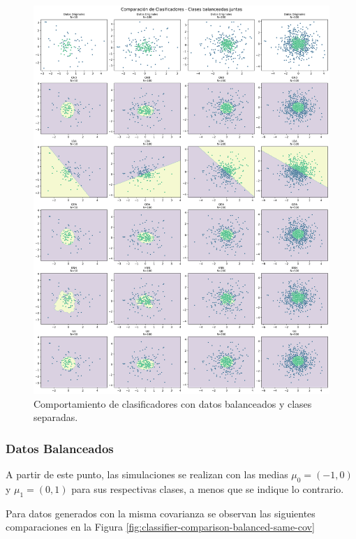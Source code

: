 \documentclass[10pt]{article}
\begin{document}
\begin{figure}[!ht]
    \centering
    \includegraphics[height=0.4\textheight]{./Parte 2/figures/classifier_comparison_balanced_joined_classes.png}
    \caption{Comportamiento de clasificadores con datos balanceados y clases separadas.}    
    \label{fig:classifier-comparison-balanced-joined-classes}
\end{figure}

\newpage

\subsubsection*{Datos Balanceados}

A partir de este punto, las simulaciones se realizan con las medias
$\mu_0=(-1,0)$ y $\mu_1=(0, 1)$ para sus respectivas clases, a menos que se
indique lo contrario.

Para datos generados con la misma covarianza se observan las siguientes
comparaciones en la Figura \ref{fig:classifier-comparison-balanced-same-cov}
\end{document}
